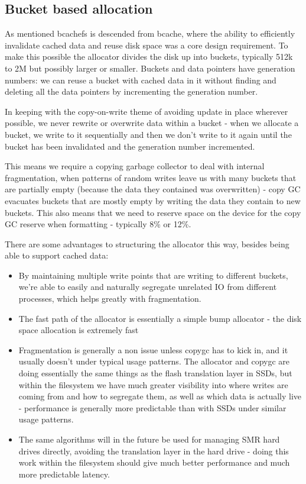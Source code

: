 \documentclass{article}
\begin{document}
\subsection{Bucket based allocation}

As mentioned bcachefs is descended from bcache, where the ability to efficiently
invalidate cached data and reuse disk space was a core design requirement. To
make this possible the allocator divides the disk up into buckets, typically
512k to 2M but possibly larger or smaller. Buckets and data pointers have
generation numbers: we can reuse a bucket with cached data in it without finding
and deleting all the data pointers by incrementing the generation number.

In keeping with the copy-on-write theme of avoiding update in place wherever
possible, we never rewrite or overwrite data within a bucket - when we allocate
a bucket, we write to it sequentially and then we don't write to it again until
the bucket has been invalidated and the generation number incremented.

This means we require a copying garbage collector to deal with internal
fragmentation, when patterns of random writes leave us with many buckets that
are partially empty (because the data they contained was overwritten) - copy GC
evacuates buckets that are mostly empty by writing the data they contain to new
buckets. This also means that we need to reserve space on the device for the
copy GC reserve when formatting - typically 8\% or 12\%.

There are some advantages to structuring the allocator this way, besides being
able to support cached data:
\begin{itemize}
	\item By maintaining multiple write points that are writing to different buckets,
		we're able to easily and naturally segregate unrelated IO from different
		processes, which helps greatly with fragmentation.

	\item The fast path of the allocator is essentially a simple bump allocator - the
		disk space allocation is extremely fast

	\item Fragmentation is generally a non issue unless copygc has to kick
		in, and it usually doesn't under typical usage patterns. The
		allocator and copygc are doing essentially the same things as
		the flash translation layer in SSDs, but within the filesystem
		we have much greater visibility into where writes are coming
		from and how to segregate them, as well as which data is
		actually live - performance is generally more predictable than
		with SSDs under similar usage patterns.

	\item The same algorithms will in the future be used for managing SMR
		hard drives directly, avoiding the translation layer in the hard
		drive - doing this work within the filesystem should give much
		better performance and much more predictable latency.
\end{itemize}
\end{document}

